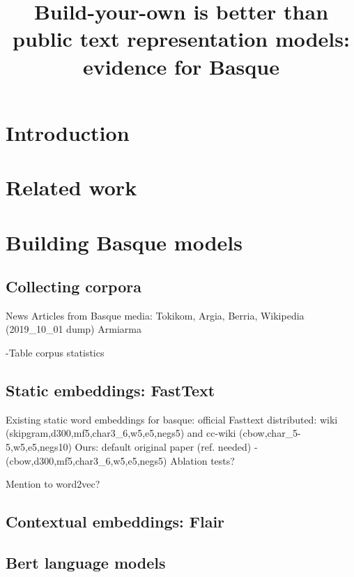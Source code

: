 \documentclass[10pt, a4paper]{article}
\title{Build-your-own is better than public text representation models: evidence for Basque}
\begin{document}
\maketitleabstract

\section{Introduction}
\label{sec:introduction}


\section{Related work}
\label{sec:related-work}


\section{Building Basque models}
\label{sec:build-basq-models}

\subsection{Collecting corpora}
\label{sec:build-basq-models:corpora}
 
 News Articles from Basque media: Tokikom, Argia, Berria, 
 Wikipedia (2019\_10\_01 dump)
 Armiarma
 
 -Table corpus statistics
 
\subsection{Static embeddings: FastText}
\label{sec:build-basq-models:static}

Existing static word embeddings for basque: official Fasttext distributed: wiki (skipgram,d300,mf5,char3\_6,w5,e5,negs5) and cc-wiki (cbow,char\_5-5,w5,e5,negs10)
Ours: default original paper (ref. needed) -  (cbow,d300,mf5,char3\_6,w5,e5,negs5)
Ablation tests?

Mention to word2vec?


\subsection{Contextual embeddings: Flair}
\label{sec:build-basq-models:flair}




\subsection{Bert language models}
\label{sec:build-basq-models:bert}
\end{document}
